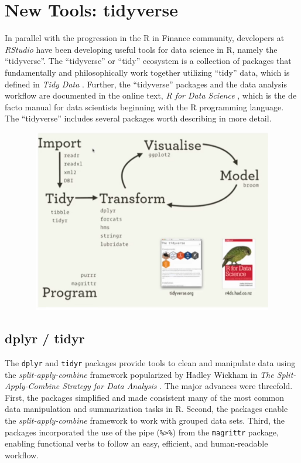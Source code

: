 \section{New Tools: tidyverse}\label{new-tools-tidyverse}

In parallel with the progression in the R in Finance community,
developers at \emph{RStudio} have been developing useful tools for data
science in R, namely the ``tidyverse''. The ``tidyverse'' or ``tidy''
ecosystem is a collection of packages that fundamentally and
philosophically work together utilizing ``tidy'' data, which is defined
in \emph{Tidy Data} \citep{tidy-data}. Further, the ``tidyverse''
packages and the data analysis workflow are documented in the online
text, \emph{R for Data Science} \citep{R4DS2017}, which is the de facto
manual for data scientists beginning with the R programming language.
The ``tidyverse'' includes several packages worth describing in more
detail.

\begin{figure}[htbp]
  \centering
  \includegraphics[width=12cm, height=8cm]{img/tidyverse}
\end{figure}

\subsection{dplyr / tidyr}\label{dplyr-tidyr}

The \texttt{dplyr} and \texttt{tidyr} packages provide tools to clean
and manipulate data using the \emph{split-apply-combine} framework
popularized by Hadley Wickham in \emph{The Split-Apply-Combine Strategy
for Data Analysis} \citep{plyr}. The major advances were threefold.
First, the packages simplified and made consistent many of the most
common data manipulation and summarization tasks in R. Second, the
packages enable the \emph{split-apply-combine} framework to work with
grouped data sets. Third, the packages incorporated the use of the pipe
(\texttt{\%\textgreater{}\%}) from the \texttt{magrittr} package,
enabling functional verbs to follow an easy, efficient, and
human-readable workflow.

